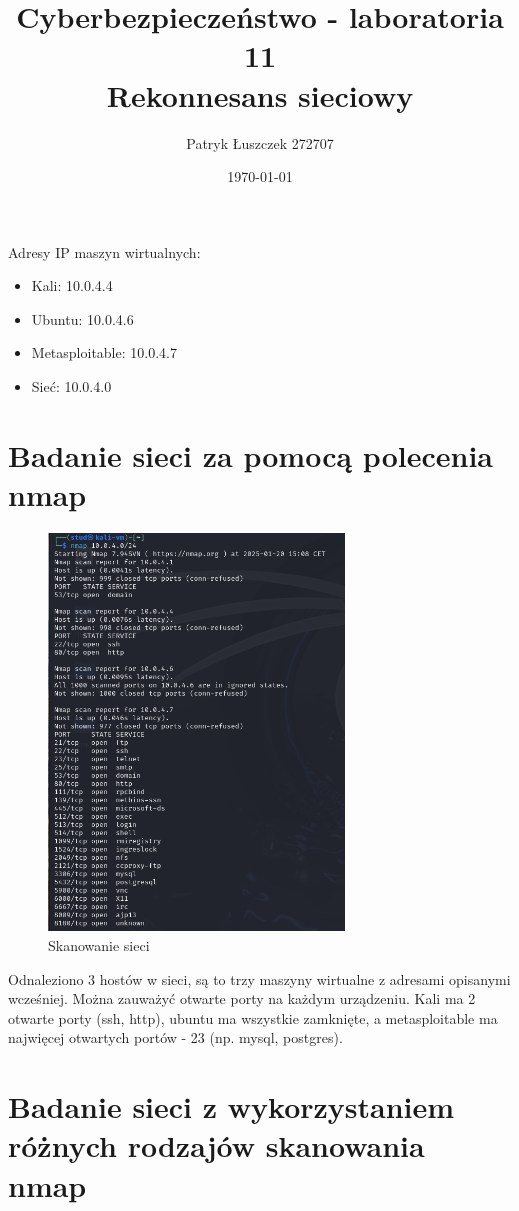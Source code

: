 \documentclass{article}
\title{%
  Cyberbezpieczeństwo - laboratoria 11 \\
  \large Rekonnesans sieciowy}
\author{Patryk Łuszczek 272707}
\date{\today}
\begin{document}
\maketitle
\newpage

Adresy IP maszyn wirtualnych:
\begin{itemize}
  \item Kali: 10.0.4.4
  \item Ubuntu: 10.0.4.6
  \item Metasploitable: 10.0.4.7
  \item Sieć: 10.0.4.0
\end{itemize}

\section*{Badanie sieci za pomocą polecenia nmap}
\begin{figure}[H]
  \centering
  \includegraphics[width=0.7\textwidth]{nmap_siec.png}
  \caption{Skanowanie sieci}
\end{figure}
Odnaleziono 3 hostów w sieci, są to trzy maszyny wirtualne z adresami opisanymi wcześniej.
Można zauważyć otwarte porty na każdym urządzeniu. Kali ma 2 otwarte porty (ssh, http), ubuntu ma wszystkie zamknięte, a metasploitable ma najwięcej
otwartych portów - 23 (np. mysql, postgres).

\section*{Badanie sieci z wykorzystaniem różnych rodzajów skanowania nmap}
\end{document}

